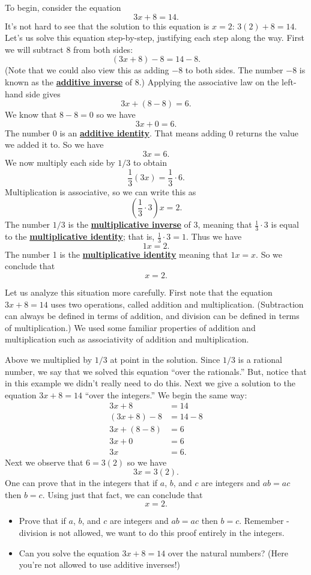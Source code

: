 \documentclass[11pt]{article}
\newenvironment{task}
	{\begin{mdframed}[linecolor=lightgray, linewidth=3pt]\raggedright}
	{\end{mdframed}}
\renewcommand\emph[1]{\underline{\bf{#1}}} %
\theoremstyle{definition}
\begin{document}
To begin, consider the equation
      \[ 3x + 8 = 14. \]
It's not hard to see that the solution to this equation is $x=2$: $3(2)+8 = 14$. Let's us solve this equation step-by-step, justifying each step along the 
way. First we will subtract $8$ from both sides:
\[ (3x+8)-8 = 14 -8.\]
(Note that we could also view this as adding $-8$ to both sides. The number $-8$ is known as the \emph{additive inverse} of $8$.) Applying the associative 
law on the left-hand side gives
\[ 3x + (8-8) = 6.\]
We know that $8-8=0$ so we have
\[ 3x + 0 = 6.\]
The number 0 is an \emph{additive identity}. That means adding 0 returns the value we added it to. So we have
\[ 3x = 6.\]
We now multiply each side by $1/3$ to obtain
\[ \frac{1}{3}(3x) = \frac{1}{3}\cdot 6. \]
Multiplication is associative, so we can write this as
\[ \left( \frac{1}{3}\cdot 3 \right)x = 2. \]
The number $1/3$ is the \emph{multiplicative inverse} of $3$, meaning that $\frac{1}{3}\cdot 3$ is equal to the \emph{multiplicative identity}; that is, $\frac{1}{3}\cdot 3 = 1$. Thus we have
\[ 1x = 2.\]
The number 1 is the \emph{multiplicative identity} meaning that $1x = x$. So we conclude that
\[ x = 2.\]

Let us analyze this situation more carefully. First note that the equation $3x+8 = 14$ uses two operations, called addition and multiplication. 
(Subtraction can always be defined in terms of addition, and division can be defined in terms of multiplication.)
We used some familiar properties of addition and multiplication such as associativity of addition and multiplication.

Above we multiplied by $1/3$ at point in the solution. Since $1/3$ is a rational number, we say that we solved this equation ``over the
rationals.'' But, notice that in this example we didn't really need to do this. Next we give a solution to the equation $3x+8=14$ ``over the
integers.'' We begin the same way:
\begin{align*}
  3x + 8 &= 14\\
 (3x+8)-8 &= 14 -8\\
 3x + (8-8) &= 6\\
 3x + 0 &= 6\\
 3x &= 6.
\end{align*}
Next we observe that $6 = 3(2)$ so we have
\[ 3x = 3(2).\]
One can prove that in the integers that if $a$, $b$, and $c$ are integers and $ab=ac$ then $b=c$. Using just that fact, we can conclude that
\[ x = 2.\]

\begin{task}
  \begin{itemize}
    \item Prove that if $a$, $b$, and $c$ are integers and $ab = ac$ then $b=c$. Remember - division is not allowed, we want to do this
      proof entirely in the integers.
    \item Can you solve the equation $3x+8=14$ over the natural numbers? (Here you're not allowed to use additive inverses!)
  \end{itemize}
\end{task}
\end{document}
